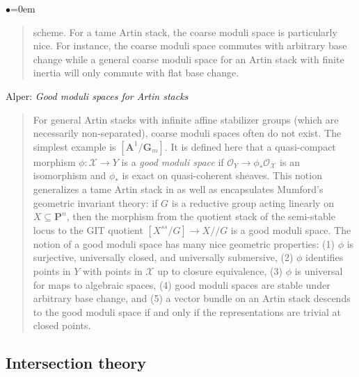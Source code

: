 \begin{list}{$\bullet$}{\leftmargin=0em}
\begin{quote}
scheme. For a tame Artin stack, the coarse moduli space is particularly nice. 
For instance, the coarse moduli space commutes with arbitrary base change while 
a general coarse moduli space for an Artin stack with finite inertia will only 
commute with flat base change.
\end{quote}
\smallskip
\item Alper: \emph{Good moduli spaces for Artin stacks} \cite{alper_good}
\begin{quote}
For general Artin stacks with infinite affine stabilizer groups (which are 
necessarily non-separated), coarse moduli spaces often do not exist. The 
simplest example is $[\mathbf{A}^1 / \mathbf{G}_m]$. It is defined here that a 
quasi-compact 
morphism $\phi: \mathcal{X} \to Y$ is a \emph{good moduli space} if 
$\mathcal{O}_Y \to \phi_* 
\mathcal{O}_\mathcal{X}$ is an isomorphism and $\phi_*$ is exact on 
quasi-coherent sheaves. 
This notion generalizes a tame Artin stack in \cite{tame} as well as 
encapsulates Mumford's geometric invariant theory: if $G$ is a reductive group 
acting linearly on $X \subseteq \mathbf{P}^n$, then the morphism from the 
quotient 
stack of the semi-stable locus to the GIT quotient $[X^{ss}/G] \to X//G$ is a 
good moduli space. The notion of a good moduli space has many nice geometric 
properties: (1) $\phi$ is surjective, universally closed, and universally 
submersive, (2) $\phi$ identifies points in $Y$ with points in $\mathcal{X}$ up 
to 
closure equivalence, (3) $\phi$ is universal for maps to algebraic spaces, (4) 
good moduli spaces are stable under arbitrary base change, and (5) a vector 
bundle on an Artin stack descends to the good moduli space if and only if the 
representations are trivial at closed points.
\end{quote}
\end{list}


\subsection{Intersection theory}
\label{subsection-intersection-theory}


